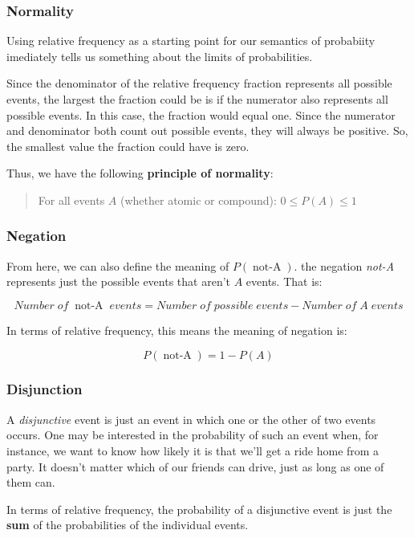 \documentclass[letterpaper,10pt]{article}
\newcommand\negate[1]{\mathop{\mbox{$not$-$#1$}}}
\begin{document}
\subsubsection{Normality}

Using relative frequency as a starting point for our semantics of probabiity imediately tells us something about the limits of probabilities.

Since the denominator of the relative frequency fraction represents all possible events, the largest the fraction could be is if the numerator also represents all possible events.  In this case, the fraction would equal one.  Since the numerator and denominator both count out possible events, they will always be positive.  So, the smallest value the fraction could have is zero.

Thus, we have the following \textbf{principle of normality}:

\begin{quote}
For all events $A$ (whether atomic or compound): $0\leq P(A) \leq 1$
\end{quote}

\subsubsection{Negation}

From here, we can also define the meaning of $P(\negate{A})$. the negation \textit{not-A} represents just the possible events that aren't $A$ events.  That is: 

\[Number\; of\; \negate{A}\; events = Number\; of\; possible\; events - Number\; of\; A\; events\]

In terms of relative frequency, this means the meaning of negation is:

\[P(\negate{A}) = 1 - P(A)\]

\subsubsection{Disjunction}
A \textit{disjunctive} event is just an event in which one or the other of two events occurs.  One may be interested in the probability of such an event when, for instance, we want to know how likely it is that we'll get a ride home from a party.  It doesn't matter which of our friends can drive, just as long as one of them can.

In terms of relative frequency, the probability of a disjunctive event is just the \textbf{sum} of the probabilities of the individual events.
\end{document}
